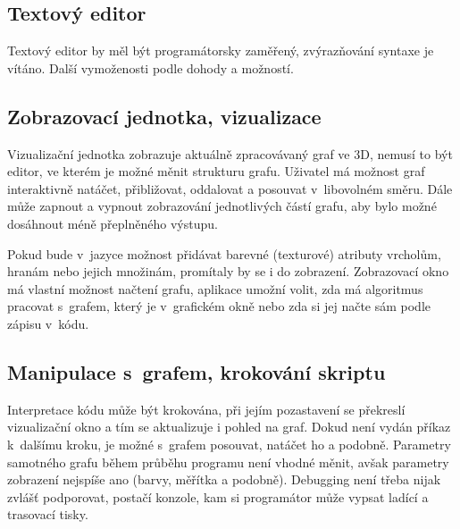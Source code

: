 \documentclass[11pt,twoside,a4paper]{book}
\begin{document}
\subsection{Textový editor}

Textový editor by měl být programátorsky zaměřený, zvýrazňování syntaxe je vítáno. Další vymoženosti podle dohody a možností.


\subsection{Zobrazovací jednotka, vizualizace}

Vizualizační jednotka zobrazuje aktuálně zpracovávaný graf ve 3D, nemusí to být editor, ve kterém je možné měnit strukturu grafu. Uživatel má možnost graf interaktivně natáčet, přibližovat, oddalovat a posouvat v~libovolném směru. Dále může zapnout a vypnout zobrazování jednotlivých částí grafu, aby bylo možné dosáhnout méně přeplněného výstupu.

Pokud bude v~jazyce možnost přidávat barevné (texturové) atributy vrcholům, hranám nebo jejich množinám, promítaly by se i do zobrazení. Zobrazovací okno má vlastní možnost načtení grafu, aplikace umožní volit, zda má algoritmus pracovat s~grafem, který je v~grafickém okně nebo zda si jej načte sám podle zápisu v~kódu.


\subsection{Manipulace s~grafem, krokování skriptu}

Interpretace kódu může být krokována, při jejím pozastavení se překreslí vizualizační okno a tím se aktualizuje i pohled na graf. Dokud není vydán příkaz k~dalšímu kroku, je možné s~grafem posouvat, natáčet ho a podobně. Parametry samotného grafu během průběhu programu není vhodné měnit, avšak parametry zobrazení nejspíše ano (barvy, měřítka a podobně). Debugging není třeba nijak zvlášť podporovat, postačí konzole, kam si programátor může vypsat ladící a trasovací tisky.
\end{document}
